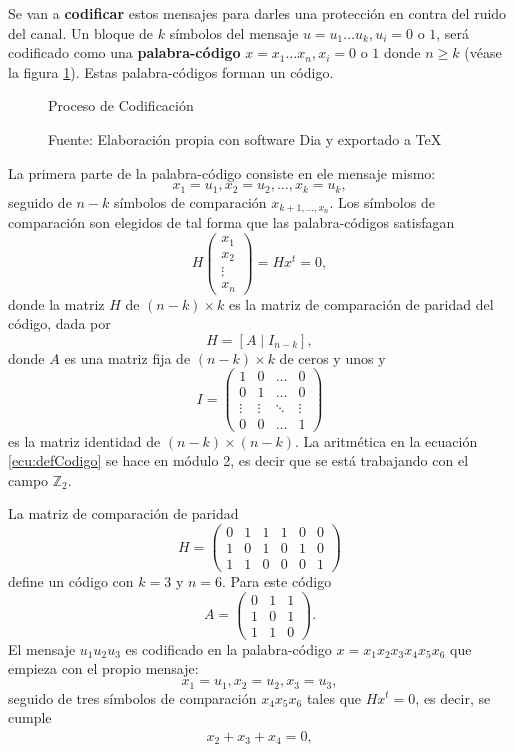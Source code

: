 Se van a \textbf{codificar} estos mensajes para darles una protección en contra del ruido del canal. Un bloque de $k$ símbolos del mensaje $u = u_1\dots u_k, u_i = 0 \mbox{ o } 1$, será codificado como una \textbf{palabra-código} $x = x_1 \dots x_n, x_i = 0 \mbox{ o } 1$ donde $n \geq k$ (véase la figura \ref{fig:codificacion}). Estas palabra-códigos forman un código.
\begin{figure}
\caption{Proceso de Codificación}
\centering

\caption*{Fuente: Elaboración propia con software Dia y exportado a \TeX}
\label{fig:codificacion}
\end{figure}
La primera parte de la palabra-código consiste en ele mensaje mismo: \[ x_1 = u_1, x_2 = u_2, \dots , x_k = u_k, \] seguido de $n-k$ símbolos de comparación $x_{k+1, \dots , x_n}$. 
Los símbolos de comparación son elegidos de tal forma que las palabra-códigos satisfagan 
\[ H \begin{pmatrix}
x_1 \\ 
x_2 \\
\vdots \\
x_n
\end{pmatrix} = Hx^{t} = 0, \] donde la matriz $H$ de $(n-k)\times k$ es la matriz de comparación de paridad del código, dada por 
\begin{equation}\label{ecu:defCodigo}
H = [A \mid I_{n-k}],
\end{equation}  
donde $A$ es una matriz fija de $(n-k)\times k$ de ceros y unos y \[ I = \begin{pmatrix}
1 & 0 & \dots & 0 \\
0 & 1 & \dots & 0 \\
\vdots & \vdots & \ddots & \vdots \\
0 & 0 & \dots & 1
\end{pmatrix} \] es la matriz identidad de $(n-k) \times (n-k)$. La aritmética en la ecuación \ref{ecu:defCodigo} se hace en módulo 2, es decir que se está trabajando con el campo $\mathds{Z}_2$. 
\begin{ejemplo}
La matriz de comparación de paridad 
\[ H = \left(\begin{array}{ccc|ccc}
0 & 1 & 1 & 1 & 0 & 0 \\
1 & 0 & 1 & 0 & 1 & 0 \\
1 & 1 & 0 & 0 & 0 & 1
\end{array}\right) \] define un código con $k=3$ y $n=6$. Para este código 
\[ A = \begin{pmatrix}
0 & 1 & 1\\
1 & 0 & 1 \\
1 & 1 & 0
\end{pmatrix}.  \]
El mensaje $u_1u_2u_3$ es codificado en la palabra-código $x = x_1x_2x_3x_4x_5x_6$ que empieza con el propio mensaje:
\[ x_1 = u_1, x_2 = u_2, x_3 = u_3, \] seguido de tres símbolos de comparación $x_4x_5x_6$ tales que $Hx^t = 0$, es decir, se cumple
\begin{eqnarray}
x_2 + x_3 + x_4 = 0, \\

\end{eqnarray}
\end{ejemplo}



